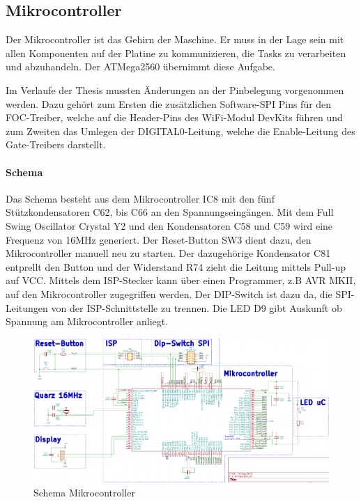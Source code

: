 \subsection{Mikrocontroller}
\label{subsec:Mikrocontroller}

Der Mikrocontroller ist das Gehirn der Maschine. Er muss in der Lage sein mit allen Komponenten auf der Platine zu kommunizieren, die Tasks zu verarbeiten und abzuhandeln. Der ATMega2560 übernimmt diese Aufgabe.

Im Verlaufe der Thesis mussten Änderungen an der Pinbelegung vorgenommen werden. Dazu gehört zum Ersten die zusätzlichen Software-SPI Pins für den FOC-Treiber, welche auf die Header-Pins des WiFi-Modul DevKits führen und zum Zweiten das Umlegen der DIGITAL0-Leitung, welche die Enable-Leitung des Gate-Treibers darstellt.

\paragraph{Schema}\mbox{}

Das Schema besteht aus dem Mikrocontroller IC8 mit den fünf Stützkondensatoren C62, bis C66 an den Spannungseingängen. Mit dem Full Swing Oscillator Crystal Y2 und den Kondensatoren C58 und C59 wird eine Frequenz von 16MHz generiert. Der Reset-Button SW3 dient dazu, den Mikrocontroller manuell neu zu starten. Der dazugehörige Kondensator C81 entprellt den Button und der Widerstand R74 zieht die Leitung mittels Pull-up auf VCC. Mittels dem ISP-Stecker kann über einen Programmer, z.B AVR MKII, auf den Mikrocontroller zugegriffen werden. Der DIP-Switch ist dazu da, die SPI-Leitungen von der ISP-Schnittstelle zu trennen. Die LED D9 gibt Auskunft ob Spannung am Mikrocontroller anliegt.

\begin{figure}[H]
\center
\includegraphics[width = \textwidth]{graphics/Schema_uC}
\caption{Schema Mikrocontroller}
\label{fig:Schema_uC}
\end{figure}

